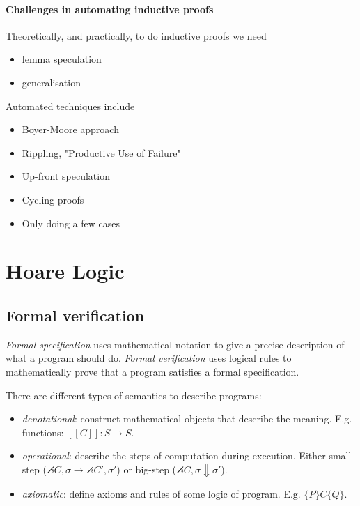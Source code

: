 \documentclass{article}
\begin{document}
\paragraph{Challenges in automating inductive proofs}

Theoretically, and practically, to do inductive proofs we need
\begin{itemize}
	\item lemma speculation
	\item generalisation
\end{itemize}

Automated techniques include
\begin{itemize}
	\item Boyer-Moore approach
	\item Rippling, "Productive Use of Failure"
	\item Up-front speculation
	\item Cycling proofs
	\item Only doing a few cases
\end{itemize}

\section{Hoare Logic}

\subsection{Formal verification}

\begin{definition}
	\emph{Formal specification} uses mathematical notation to give a precise description
	of what a program should do. \emph{Formal verification} uses logical rules to mathematically
	prove that a program satisfies a formal specification.

	There are different types of semantics to describe programs:
	\begin{itemize}
		\item \emph{denotational}: construct mathematical objects that describe the meaning.
		      E.g. functions: $[\![C]\!]:S\to S$.
		\item \emph{operational}: describe the steps of computation during execution. Either
		      small-step ($\angles{C,\sigma}\to\angles{C',\sigma'}$) or big-step ($\angles{C,\sigma}\Downarrow\sigma'$).
		\item \emph{axiomatic}: define axioms and rules of some logic of program. E.g. $\{P\}C\{Q\}$.
	\end{itemize}
\end{definition}
\end{document}
